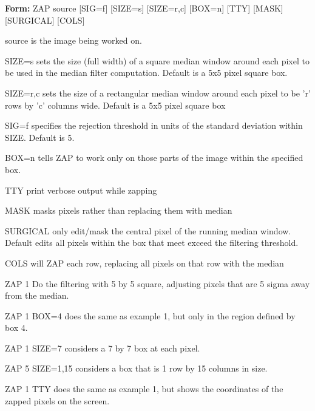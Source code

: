 {\newpage\clearpage
{}%
\begin{command}
  \item[\textbf{Form: }ZAP source {[SIG=f]} {[SIZE=s]} {[SIZE=r,c]} 
       {[BOX=n]} {[TTY]} {[MASK]} {[SURGICAL]} {[COLS]} \hfill]{}
  \item[source]{is the} image being worked on.
  \item[SIZE=s]{sets the size (full width) of a square median
       window around each pixel to be used in the median filter
       computation.  Default is a 5x5 pixel square box.}
  \item[SIZE=r,c]{sets the size of a rectangular median window
       around each pixel to be 'r' rows by 'c' columns wide.  Default
       is a 5x5 pixel square box}
  \item[SIG=f]{specifies the rejection threshold in units
       of the standard deviation within SIZE.  Default is 5}.
  \item[BOX=n]{tells ZAP to work only on those parts of the image
       within the specified box}.
  \item[TTY]{print verbose output while zapping}
  \item[MASK]{masks pixels rather than replacing them with median}
  \item[SURGICAL]{only edit/mask the central pixel of the running
       median window.  Default edits all pixels within the box that
       meet exceed the filtering threshold.}
  \item[COLS]{will ZAP each row, replacing all pixels on that row with the median}
\end{command}%
\lthtmlfigureZ
\lthtmlcheckvsize\clearpage}

{\newpage\clearpage
{}%
\begin{example}
  \item[ZAP 1\hfill]{Do the filtering with 5 by 5 square,
       adjusting pixels that are 5 sigma away from the median.}
  \item[ZAP 1 BOX=4\hfill]{does the same as example 1, but only in the
       region defined by box 4.}
  \item[ZAP 1 SIZE=7\hfill]{considers a 7 by 7 box at each pixel.}
  \item[ZAP 5 SIZE=1,15\hfill]{considers a box that is 1 row by 15 columns
       in size.}
  \item[ZAP 1 TTY\hfill]{does the same as example 1, but shows the
       coordinates of the zapped pixels on the screen.}
\end{example}%
\lthtmlfigureZ
\lthtmlcheckvsize\clearpage}

